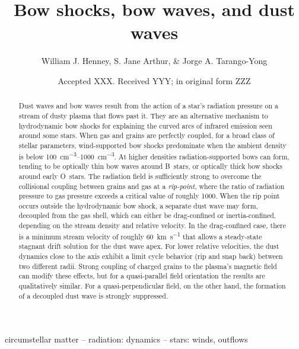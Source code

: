 \documentclass[useAMS, usenatbib, a4paper]{mnras}
\title
{Bow shocks, bow waves, and dust waves}
\author[Henney, Arthur, \& Tarango Yong]{
  William J. Henney, S. Jane Arthur, \& Jorge A. Tarango-Yong\\
  \AddressCRyA
}
\date{Accepted XXX. Received YYY; in original form ZZZ}
\begin{document}
\label{firstpage}
\pagerange{\pageref{firstpage}--\pageref{lastpage}}
\maketitle
\begin{abstract}
  Dust waves and bow waves result from the action of a star's
  radiation pressure on a stream of dusty plasma that flows past it.
  They are an alternative mechanism to hydrodynamic bow shocks for
  explaining the curved arcs of infrared emission seen around some
  stars.  When gas and grains are perfectly coupled, for a broad class
  of stellar parameters, wind-supported bow shocks predominate when
  the ambient density is below \SIrange{100}{1000}{cm^{-3}}.  At
  higher densities radiation-supported bows can form, tending to be
  optically thin bow waves around B~stars, or optically thick bow
  shocks around early O~stars.  The radiation field is sufficiently
  strong to overcome the collisional coupling between grains and gas
  at a \textit{rip-point}, where the ratio of radiation pressure to
  gas pressure exceeds a critical value of roughly 1000.  When the rip
  point occurs outside the hydrodynamic bow shock, a separate dust
  wave may form, decoupled from the gas shell, which can either be
  drag-confined or inertia-confined, depending on the stream density
  and relative velocity.  In the drag-confined case, there is a
  minimum stream velocity of roughly \SI{60}{km.s^{-1}} that allows a
  steady-state stagnant drift solution for the dust wave apex.  For
  lower relative velocities, the dust dynamics close to the axis
  exhibit a limit cycle behavior (rip and snap back) between two
  different radii.  Strong coupling of charged grains to the plasma's
  magnetic field can modify these effects, but for a quasi-parallel
  field orientation the results are qualitatively similar. For a
  quasi-perpendicular field, on the other hand, the formation of a
  decoupled dust wave is strongly suppressed.
\end{abstract}

\begin{keywords}
  circumstellar matter -- radiation: dynamics -- stars: winds, outflows
\end{keywords}





\appendix




%

\bsp	%
\label{lastpage}
\end{document}
